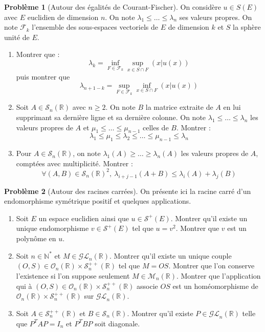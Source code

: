 \documentclass[french]{book}
\newcommand{\N}{\mathbb{N}}
\newcommand{\R}{\mathbb{R}}
\newcommand{\st}{^*}
\theoremstyle{definition}
\newtheorem{pro}{Problème}[chapter]
\begin{document}
\begin{pro}[Autour des égalités de Courant-Fischer]
	On considère $u\in S(E)$ avec $E$ euclidien de dimension $n$. On note $\lambda_1\leqslant\ldots\leqslant\lambda_n$ ses valeurs propres. On note $\mathcal{F}_k$ l'ensemble des sous-espaces vectoriels de $E$ de dimension $k$ et $S$ la sphère unité de $E$.
	\begin{enumerate}
		\item Montrer que : $$\lambda_k=\inf_{F\in\mathcal{F}_k}\sup_{x\in S\cap F}(x|u(x))$$ puis montrer que $$\lambda_{n+1-k}=\sup_{F\in\mathcal{F}_k}\inf_{x\in S\cap F}(x|u(x))$$
		\item Soit $A\in\mathcal{S}_n(\R)$ avec $n\geqslant 2$. On note $B$ la matrice extraite de $A$ en lui supprimant sa dernière ligne et sa dernière colonne. On note $\lambda_1\leqslant\ldots\leqslant\lambda_n$ les valeurs propres de $A$ et $\mu_1\leqslant\ldots\leqslant\mu_{n-1}$ celles de $B$. Montrer : $$\lambda_1\leqslant\mu_1\leqslant\lambda_2\leqslant\ldots\leqslant\mu_{n-1}\leqslant\lambda_n$$
		\item Pour $A\in\mathcal{S}_n(\R)$, on note $\lambda_1(A)\geqslant\ldots\geqslant\lambda_n(A)$ les valeurs propres de $A$, comptées avec multiplicité. Montrer : $$\forall (A,B)\in\mathcal{S}_n(\R)^2,\ \lambda_{i+j-1}(A+B)\leqslant\lambda_i(A)+\lambda_j(B)$$
	\end{enumerate}
\end{pro}

\begin{pro}[Autour des racines carrées]
	On présente ici la racine carré d'un endomorphisme symétrique positif et quelques applications.
	\begin{enumerate}
		\item Soit $E$ un espace euclidien ainsi que $u\in\mathcal{S}^+(E)$. Montrer qu'il existe un unique endomorphisme $v\in\mathcal{S}^+(E)$ tel que $u=v^2$. Montrer que $v$ est un polynôme en $u$.
		\item Soit $n\in\N\st$ et $M\in\mathcal{GL}_n(\R)$. Montrer qu'il existe un unique couple $(O,S)\in\mathcal{O}_n(\R)\times\mathcal{S}_n^{++}(\R)$ tel que $M=OS$. Montrer que l'on conserve l'existence si l'on suppose seulement $M\in\mathcal{M}_n(\R)$. Montrer que l'application qui à $(O,S)\in\mathcal{O}_n(\R)\times\mathcal{S}_n^{++}(\R)$ associe $OS$ est un homéomorphisme de $\mathcal{O}_n(\R)\times\mathcal{S}_n^{++}(\R)$ sur $\mathcal{GL}_n(\R)$.
		\item Soit $A\in\mathcal{S}_n^{++}(\R)$ et $B\in\mathcal{S}_n(\R)$. Montrer qu'il existe $P\in\mathcal{GL}_n(\R)$ telle que $P^TAP=I_n$ et $P^TBP$ soit diagonale.
	\end{enumerate}
\end{pro}
\end{document}
